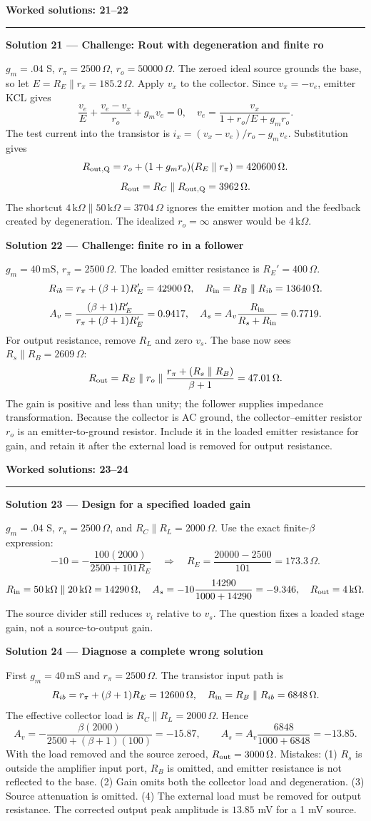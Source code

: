 \documentclass[11pt,a4paper]{article}
\newcommand{\K}{\,\mathrm{k}\Omega}\newcommand{\Oh}{\,\Omega}\newcommand{\mS}{\,\mathrm{mS}}
\newcommand{\head}[1]{\par{\Large\bfseries\color{ink}#1}\par\vspace{3pt}\hrule\vspace{7pt}}
\newcommand{\sol}[2]{\par{\large\bfseries\color{ink}Solution #1 --- #2}\label{sol:#1}\par}
\begin{document}
\newpage
\head{Worked solutions: 21--22}
\sol{21}{Challenge: Rout with degeneration and finite ro}$g_m=.04$ S, $r_\pi=2500\Oh$, $r_o=50000\Oh$. The zeroed ideal source grounds the base, so let $E=R_E\parallel r_\pi=185.2\Oh$. Apply $v_x$ to the collector. Since $v_\pi=-v_e$, emitter KCL gives
\[\frac{v_e}{E}+\frac{v_e-v_x}{r_o}+g_mv_e=0,
\quad v_e=\frac{v_x}{1+r_o/E+g_mr_o}.\]
The test current into the transistor is $i_x=(v_x-v_e)/r_o-g_mv_e$. Substitution gives
\[R_{\rm out,Q}=r_o+(1+g_mr_o)(R_E\parallel r_\pi)=420600\Oh.\]
\[R_{\rm out}=R_C\parallel R_{\rm out,Q}=3962\Oh.\]
The shortcut $4\K\parallel50\K=3704\Oh$ ignores the emitter motion and the feedback created by degeneration. The idealized $r_o=\infty$ answer would be $4\K$.\par\vfill
\sol{22}{Challenge: finite ro in a follower}$g_m=40\mS$, $r_\pi=2500\Oh$. The loaded emitter resistance is $R_E'=400\Oh$.
\[R_{ib}=r_\pi+(\beta+1)R_E'=42900\Oh,\quad R_{\rm in}=R_B\parallel R_{ib}=13640\Oh.\]
\[A_v=\frac{(\beta+1)R_E'}{r_\pi+(\beta+1)R_E'}=0.9417,\quad A_s=A_v\frac{R_{\rm in}}{R_s+R_{\rm in}}=0.7719.\]
For output resistance, remove $R_L$ and zero $v_s$. The base now sees $R_s\parallel R_B=2609\Oh$:
\[R_{\rm out}=R_E\parallel r_o\parallel\frac{r_\pi+(R_s\parallel R_B)}{\beta+1}=47.01\Oh.\]
The gain is positive and less than unity; the follower supplies impedance transformation. Because the collector is AC ground, the collector--emitter resistor $r_o$ is an emitter-to-ground resistor. Include it in the loaded emitter resistance for gain, and retain it after the external load is removed for output resistance.\par\vfill

\newpage
\head{Worked solutions: 23--24}
\sol{23}{Design for a specified loaded gain}$g_m=.04$ S, $r_\pi=2500\Oh$, and $R_C\parallel R_L=2000\Oh$. Use the exact finite-$\beta$ expression:
\[-10=-\frac{100(2000)}{2500+101R_E}\quad\Rightarrow\quad
R_E=\frac{20000-2500}{101}=173.3\Oh.\]
\[R_{\rm in}=50\K\parallel20\K=14290\Oh,\quad
A_s=-10\frac{14290}{1000+14290}=-9.346,\quad R_{\rm out}=4\K.\]
The source divider still reduces $v_i$ relative to $v_s$. The question fixes a loaded stage gain, not a source-to-output gain.\par\vfill
\sol{24}{Diagnose a complete wrong solution}First $g_m=40\mS$ and $r_\pi=2500\Oh$. The transistor input path is
\[R_{ib}=r_\pi+(\beta+1)R_E=12600\Oh,\quad R_{\rm in}=R_B\parallel R_{ib}=6848\Oh.\]
The effective collector load is $R_C\parallel R_L=2000\Oh$. Hence
\[A_v=-\frac{\beta(2000)}{2500+(\beta+1)(100)}=-15.87,\qquad
A_s=A_v\frac{6848}{1000+6848}=-13.85.\]
With the load removed and the source zeroed, $R_{\rm out}=3000\Oh$. Mistakes: (1) $R_s$ is outside the amplifier input port, $R_B$ is omitted, and emitter resistance is not reflected to the base. (2) Gain omits both the collector load and degeneration. (3) Source attenuation is omitted. (4) The external load must be removed for output resistance. The corrected output peak amplitude is $13.85$ mV for a 1 mV source.\par\vfill
\end{document}
